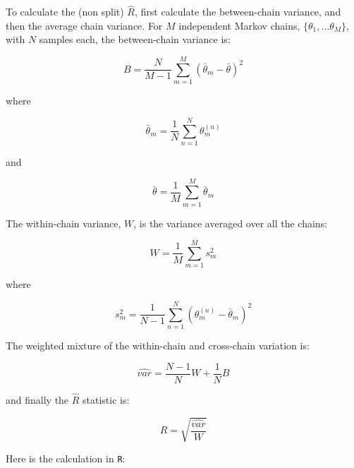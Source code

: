\documentclass[11pt, oneside, openany]{scrbook}
\begin{document}
To calculate the (non split) \(\hat{R}\), first calculate the between-chain variance, and then the average chain variance. For \(M\) independent Markov chains, \(\{\theta_1, \ldots \theta_M\}\), with \(N\) samples each, the between-chain variance is:


\[
B = \frac{N}{M-1}\sum_{m=1}^{M}\left(\bar{\theta}_m - \bar{\theta}\right)^2
\]

where

\[
\bar{\theta}_m = \frac{1}{N}\sum_{n=1}^{N}\theta_{m}^{(n)}
\]

and

\[
\bar{\theta} = \frac{1}{M}\sum_{m=1}^{M}\bar{\theta}_m
\]

The within-chain variance, \(W\), is the variance averaged over all the chains:

\[
W = \frac{1}{M}\sum_{m=1}^{M} s_{m}^2
\]

where

\[
s_{m}^2 = \frac{1}{N-1}\sum_{n=1}^{N}\left(\theta_{m}^{(n)} - \bar{\theta}_m\right)^2
\]

The weighted mixture of the within-chain and cross-chain variation is:


\[
\hat{var} = \frac{N-1}{N} W + \frac{1}{N} B
\]

and finally the \(\hat{R}\) statistic is:

\[
\hat{R} = \sqrt{\frac{\hat{var}}{W}}
\]

Here is the calculation in \texttt{R}:
\end{document}

